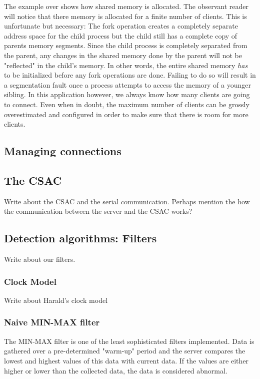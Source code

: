 \documentclass[12pt,english,a4paper]{report}
\begin{document}
The example over shows how shared memory is allocated. The observant reader will notice that there memory is allocated for a finite number of clients. This is unfortunate but necessary: The fork operation creates a completely separate address space for the child process but the child still has a complete copy of parents memory segments. Since the child process is completely separated from the parent, any changes in the shared memory done by the parent will not be "reflected" in the child's memory. In other words, the entire shared memory \textit{has} to be initialized before any fork operations are done. Failing to do so will result in a segmentation fault once a process attempts to access the memory of a younger sibling. In this application however, we always know how many clients are going to connect. Even when in doubt, the maximum number of clients can be grossly overestimated and configured in order to make sure that there is room for more clients.

\subsection{Managing connections}

\subsection{The CSAC}
Write about the CSAC and the serial communication. Perhaps mention the how the communication between the server and the CSAC works?

\subsection{Detection algorithms: Filters}
Write about our filters.

\subsubsection{Clock Model}
Write about Harald's clock model

\subsubsection{Naive MIN-MAX filter}
The MIN-MAX filter is one of the least sophisticated filters implemented. Data is gathered over a pre-determined "warm-up" period and the server compares the lowest and highest values of this data with current data. If the values are either higher or lower than the collected data, the data is considered abnormal. 
\end{document}
